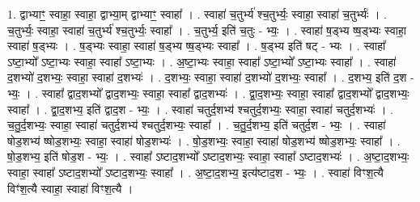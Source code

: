 \documentclass[17pt]{extarticle}
\begin{document}
1. द्वाभ्याꣳ॒॒ स्वाहा॒ स्वाहा॒ द्वाभ्या॒म् द्वाभ्याꣳ॒॒ स्वाहा᳚ । . स्वाहा॑ च॒तुर्भ्य॑ श्च॒तुर्भ्यः॒ स्वाहा॒ स्वाहा॑ च॒तुर्भ्यः॑ । . च॒तुर्भ्यः॒ स्वाहा॒ स्वाहा॑ च॒तुर्भ्य॑ श्च॒तुर्भ्यः॒ स्वाहा᳚ । . च॒तुर्भ्य॒ इति॑ च॒तुः - भ्यः॒ । . स्वाहा॑ ष॒ड्भ्य ष्ष॒ड्भ्यः स्वाहा॒ स्वाहा॑ ष॒ड्भ्यः । . ष॒ड्भ्यः स्वाहा॒ स्वाहा॑ ष॒ड्भ्य ष्ष॒ड्भ्यः स्वाहा᳚ । . ष॒ड्भ्य इति॑ षट् - भ्यः । . स्वाहा᳚ ऽष्टा॒भ्यो᳚ ऽष्टा॒भ्यः स्वाहा॒ स्वाहा᳚ ऽष्टा॒भ्यः । . अ॒ष्टा॒भ्यः स्वाहा॒ स्वाहा᳚ ऽष्टा॒भ्यो᳚ ऽष्टा॒भ्यः स्वाहा᳚ । . स्वाहा॑ द॒शभ्यो॑ द॒शभ्यः॒ स्वाहा॒ स्वाहा॑ द॒शभ्यः॑ । . द॒शभ्यः॒ स्वाहा॒ स्वाहा॑ द॒शभ्यो॑ द॒शभ्यः॒ स्वाहा᳚ । . द॒शभ्य॒ इति॑ द॒श - भ्यः॒ । . स्वाहा᳚ द्वाद॒शभ्यो᳚ द्वाद॒शभ्यः॒ स्वाहा॒ स्वाहा᳚ द्वाद॒शभ्यः॑ । . द्वा॒द॒शभ्यः॒ स्वाहा॒ स्वाहा᳚ द्वाद॒शभ्यो᳚ द्वाद॒शभ्यः॒ स्वाहा᳚ । . द्वा॒द॒शभ्य॒ इति॑ द्वाद॒श - भ्यः॒ । . स्वाहा॑ चतुर्द॒शभ्य॑ श्चतुर्द॒शभ्यः॒ स्वाहा॒ स्वाहा॑ चतुर्द॒शभ्यः॑ । . च॒तु॒र्द॒शभ्यः॒ स्वाहा॒ स्वाहा॑ चतुर्द॒शभ्य॑ श्चतुर्द॒शभ्यः॒ स्वाहा᳚ । . च॒तु॒र्द॒शभ्य॒ इति॑ चतुर्द॒श - भ्यः॒ । . स्वाहा॑ षोड॒शभ्य॑ ष्षोड॒शभ्यः॒ स्वाहा॒ स्वाहा॑ षोड॒शभ्यः॑ । . षो॒ड॒शभ्यः॒ स्वाहा॒ स्वाहा॑ षोड॒शभ्य॑ ष्षोड॒शभ्यः॒ स्वाहा᳚ । . षो॒ड॒शभ्य॒ इति॑ षोड॒श - भ्यः॒ । . स्वाहा᳚ ऽष्टाद॒शभ्यो᳚ ऽष्टाद॒शभ्यः॒ स्वाहा॒ स्वाहा᳚ ऽष्टाद॒शभ्यः॑ । . अ॒ष्टा॒द॒शभ्यः॒ स्वाहा॒ स्वाहा᳚ ऽष्टाद॒शभ्यो᳚ ऽष्टाद॒शभ्यः॒ स्वाहा᳚ । . अ॒ष्टा॒द॒शभ्य॒ इत्य॑ष्टाद॒श - भ्यः॒ । . स्वाहा॑ विꣳश॒त्यै विꣳ॑श॒त्यै स्वाहा॒ स्वाहा॑ विꣳश॒त्यै । \newline
\end{document}
